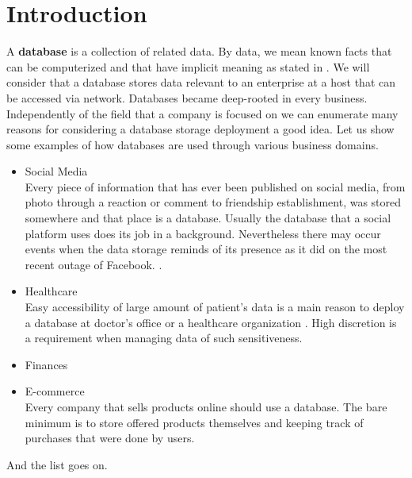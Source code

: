 \chapter{Introduction}

\par 
A \textbf{database} is a collection of related data. By data, we mean known facts that can be computerized and that have implicit meaning as stated in  \cite{ElmasryNavathe15}. We will consider that a database stores data relevant to an enterprise at a host that can be accessed via network.
Databases became deep-rooted in every business. 
Independently of the field that a company is focused on we can enumerate many reasons for considering a database storage deployment a good idea.
Let us show some examples of how databases are used through various business domains.

\begin{itemize}
	
	\item Social Media \\
	Every piece of information that has ever been published on social media, from photo through a reaction or comment to friendship establishment, was stored somewhere and that place is a database. Usually the database that a social platform uses does its job in a background. Nevertheless there may occur events when the data storage reminds of its presence as it did on the most recent outage of Facebook. \cite{Facebook19}.
	
	\item Healthcare \\
	Easy accessibility of large amount of patient's data is a main reason to deploy a database at doctor's office or a healthcare organization \cite{Healthcare13}. High discretion is a requirement when managing data of such sensitiveness.
	
	\item Finances \\
	
	\item E-commerce \\
	Every company that sells products online should use a database. The bare minimum is to store offered products themselves and keeping track of purchases that were done by users.
	
	
\end{itemize}
And the list goes on.
 \\

